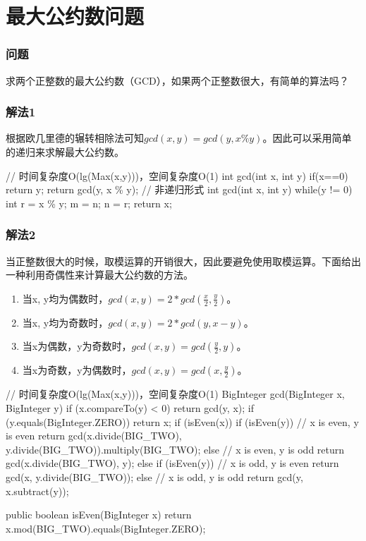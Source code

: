 \section{最大公约数问题} %
\label{sec:gcd}

\subsubsection{问题}
求两个正整数的最大公约数（GCD），如果两个正整数很大，有简单的算法吗？

\subsubsection{解法1}

根据欧几里德的辗转相除法可知$gcd(x, y) = gcd(y, x \% y)$。因此可以采用简单的递归来求解最大公约数。

\begin{Code}
// 时间复杂度O(lg(Max(x,y)))，空间复杂度O(1)
int gcd(int x, int y) {
	if(x==0) return y;
	return gcd(y, x \% y);
}
// 非递归形式
int gcd(int x, int y) {
	while(y != 0) {
		int r = x \% y;
		m = n;
		n = r;
	}
	return x;
}
\end{Code}

\subsubsection{解法2}

当正整数很大的时候，取模运算的开销很大，因此要避免使用取模运算。下面给出一种利用奇偶性来计算最大公约数的方法。
\begin{enumerate}
	\item 当x, y均为偶数时，$gcd(x,y) = 2 * gcd(\frac{x}{2}, \frac{y}{2})$。	
	\item 当x, y均为奇数时，$gcd(x,y) = 2 * gcd(y, x-y)$。
	\item 当x为偶数，y为奇数时，$gcd(x,y) = gcd(\frac{y}{2}, y)$。
	\item 当x为奇数，y为偶数时，$gcd(x,y) = gcd(x, \frac{y}{2})$。
\end{enumerate}

\begin{Code}
// 时间复杂度O(lg(Max(x,y)))，空间复杂度O(1)
BigInteger gcd(BigInteger x, BigInteger y) {
    if (x.compareTo(y) < 0) {
        return gcd(y, x);
    }
    if (y.equals(BigInteger.ZERO)) {
        return x;
    }
    if (isEven(x)) {
        if (isEven(y)) { // x is even, y is even
    	    return gcd(x.divide(BIG_TWO), y.divide(BIG_TWO)).multiply(BIG_TWO);
        } else { // x is even, y is odd
            return gcd(x.divide(BIG_TWO), y);	
        }
    } else {
        if (isEven(y)) { // x is odd, y is even
            return gcd(x, y.divide(BIG_TWO));
        } else { // x is odd, y is odd
            return gcd(y, x.subtract(y));
        }
    }
}

public boolean isEven(BigInteger x) {
	return x.mod(BIG_TWO).equals(BigInteger.ZERO);
}
\end{Code}

